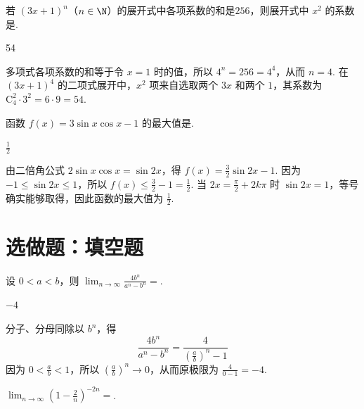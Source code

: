\documentclass[UTF8,a4paper,oneside,11pt]{ctexbook}
\begin{document}
\begin{problem}
若 \((3x+1)^{n}\)（\(n\in \N\)）的展开式中各项系数的和是\(256\)，则展开式中 \(x^{2}\) 的系数是\fillinblank{}.
\end{problem}

\begin{answer}
54
\end{answer}

\begin{solution}
多项式各项系数的和等于令 \(x=1\) 时的值，所以 \(4^n=256=4^4\)，从而 \(n=4\). 在 \((3x+1)^4\) 的二项式展开中，\(x^2\) 项来自选取两个 \(3x\) 和两个 \(1\)，其系数为 \(\mathrm C_4^2\cdot3^2=6\cdot9=54\).
\end{solution}

\begin{problem}
函数 \(f(x)=3\sin x\cos x-1\) 的最大值是\fillinblank{}.
\end{problem}

\begin{answer}
\(\frac{1}{2}\)
\end{answer}

\begin{solution}
由二倍角公式 \(2\sin x\cos x=\sin 2x\)，得 \(f(x)=\frac32\sin 2x-1\). 因为 \(-1\leqslant\sin 2x\leqslant1\)，所以 \(f(x)\leqslant\frac32-1=\frac12\). 当 \(2x=\frac\pi2+2k\pi\) 时 \(\sin 2x=1\)，等号确实能够取得，因此函数的最大值为 \(\frac12\).
\end{solution}

\section{选做题：填空题}

\begin{problem}[A]
设 \(0 < a < b\)，则 \(\displaystyle\lim_{n \to \infty} \frac{4b^n}{a^n-b^n}=\)\fillinblank{}.
\end{problem}

\begin{answer}
\(-4\)
\end{answer}

\begin{solution}
分子、分母同除以 \(b^n\)，得
\[
\frac{4b^n}{a^n-b^n}=\frac{4}{\left(\frac ab\right)^n-1}
\]
因为 \(0<\frac ab<1\)，所以 \(\left(\frac ab\right)^n\to0\)，从而原极限为 \(\frac4{0-1}=-4\).
\end{solution}

\reuseproblemnumber
\begin{problem}[B]
\(\displaystyle\lim_{n\to\infty}\left(1-\frac{2}{n}\right)^{-2n}=\)\fillinblank{}.
\end{problem}
\end{document}
